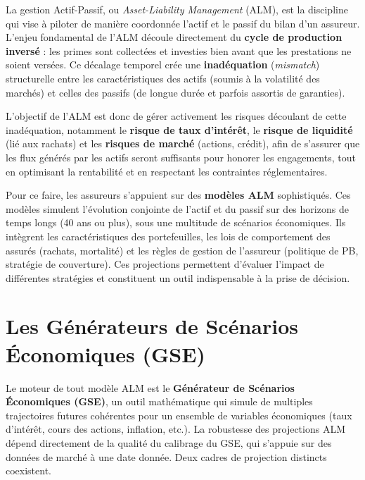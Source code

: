 La gestion Actif-Passif, ou \textit{Asset-Liability Management} (ALM), est la discipline qui vise à piloter de manière coordonnée l'actif et le passif du bilan d'un assureur. L'enjeu fondamental de l'ALM découle directement du \textbf{cycle de production inversé} : les primes sont collectées et investies bien avant que les prestations ne soient versées. Ce décalage temporel crée une \textbf{inadéquation} (\textit{mismatch}) structurelle entre les caractéristiques des actifs (soumis à la volatilité des marchés) et celles des passifs (de longue durée et parfois assortis de garanties).

\bigskip

L'objectif de l'ALM est donc de gérer activement les risques découlant de cette inadéquation, notamment le \textbf{risque de taux d'intérêt}, le \textbf{risque de liquidité} (lié aux rachats) et les \textbf{risques de marché} (actions, crédit), afin de s'assurer que les flux générés par les actifs seront suffisants pour honorer les engagements, tout en optimisant la rentabilité et en respectant les contraintes réglementaires.

\bigskip

Pour ce faire, les assureurs s'appuient sur des \textbf{modèles ALM} sophistiqués. Ces modèles simulent l'évolution conjointe de l'actif et du passif sur des horizons de temps longs (40 ans ou plus), sous une multitude de scénarios économiques. Ils intègrent les caractéristiques des portefeuilles, les lois de comportement des assurés (rachats, mortalité) et les règles de gestion de l'assureur (politique de PB, stratégie de couverture). Ces projections permettent d'évaluer l'impact de différentes stratégies et constituent un outil indispensable à la prise de décision.

\section{Les Générateurs de Scénarios Économiques (GSE)}
\label{sec:gse}

Le moteur de tout modèle ALM est le \textbf{Générateur de Scénarios Économiques (GSE)}, un outil mathématique qui simule de multiples trajectoires futures cohérentes pour un ensemble de variables économiques (taux d'intérêt, cours des actions, inflation, etc.). La robustesse des projections ALM dépend directement de la qualité du calibrage du GSE, qui s'appuie sur des données de marché à une date donnée. Deux cadres de projection distincts coexistent.

\bigskip

